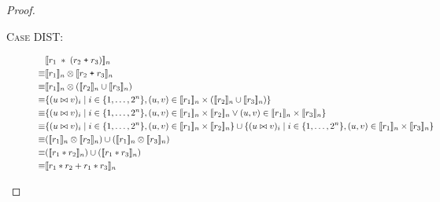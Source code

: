 \begin{proof}
\begin{description}
  \item[\textsc{Case DIST}:]
    \begin{align*}
             & \llbracket{r_1 \; \ast \; (r_2 \; \texttt{+} \; r_3)}\rrbracket_n \\
      \equiv & \llbracket{r_1}\rrbracket_n \otimes \llbracket{r_2 \; \texttt{+} \; r_3}\rrbracket_n \\
      \equiv & \llbracket{r_1}\rrbracket_n \otimes (\llbracket{r_2}\rrbracket_n \cup \llbracket{r_3}\rrbracket_n) \\
      \equiv & \{ (u \bowtie v)_i \mid i \in \{ 1, \ldots, 2^n \}, (u,v) \in
        \llbracket{r_1}\rrbracket_n \times (\llbracket{r_2}\rrbracket_n \cup \llbracket{r_3}\rrbracket_n) \} \\
      \equiv & \{ (u \bowtie v)_i \mid i \in \{ 1, \ldots, 2^n \}, (u,v) \in
        \llbracket{r_1}\rrbracket_n \times \llbracket{r_2}\rrbracket_n \vee (u,v) \in \llbracket{r_1}\rrbracket_n
        \times \llbracket{r_3}\rrbracket_n \} \\
      \equiv & \{ (u \bowtie v)_i \mid i \in \{ 1, \ldots, 2^n \}, (u,v) \in
        \llbracket{r_1}\rrbracket_n \times \llbracket{r_2}\rrbracket_n \}
        \cup \{ (u \bowtie v)_i \mid i \in \{ 1, \ldots, 2^n \}, (u,v) \in
        \llbracket{r_1}\rrbracket_n \times \llbracket{r_3}\rrbracket_n \} \\
      \equiv & (\llbracket{r_1}\rrbracket_n \otimes \llbracket{r_2}\rrbracket_n)
        \cup (\llbracket{r_1}\rrbracket_n \otimes \llbracket{r_3}\rrbracket_n) \\
      \equiv & (\llbracket{r_1 \ast r_2}\rrbracket_n) \cup (\llbracket{r_1 \ast r_3}\rrbracket_n) \\
      \equiv & \llbracket{r_1 \ast r_2 + r_1 \ast r_3}\rrbracket_n \\
    \end{align*}
\end{description}
\end{proof}

